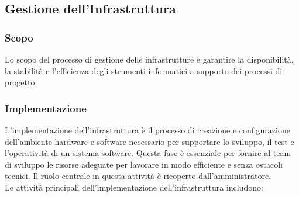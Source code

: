 \subsection{Gestione dell'Infrastruttura}
\subsubsection{Scopo}
Lo scopo del processo di gestione delle infrastrutture è garantire la disponibilità, la stabilità e l'efficienza degli strumenti informatici a supporto dei processi di progetto.

\subsubsection{Implementazione}
L’implementazione dell’infrastruttura è il processo di creazione e configurazione dell’ambiente hardware e software necessario per supportare lo sviluppo, il test e l’operatività di un sistema software. Questa fase è essenziale per fornire al team di sviluppo le risorse adeguate per lavorare in modo efficiente e senza ostacoli tecnici. Il ruolo centrale in questa attività è ricoperto dall’amministratore. \\
Le attività principali dell’implementazione dell’infrastruttura includono:
